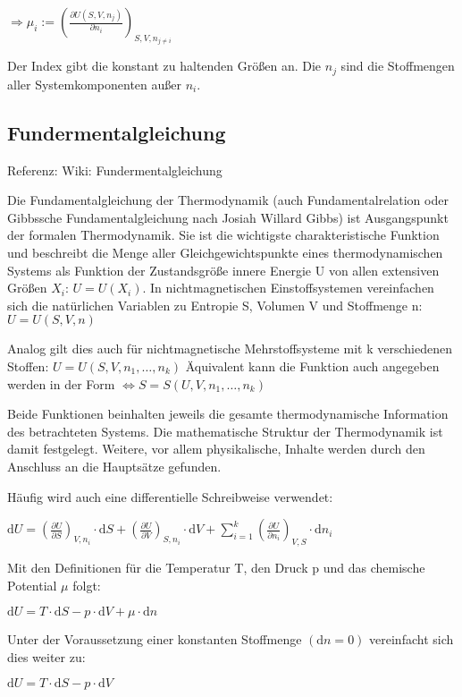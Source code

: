 \documentclass[]{article}
\begin{document}
   $ \Rightarrow \mu_i := \left( \frac{\partial U(S,V,n_j)}{\partial {n_i}} \right)_{S,V,n_{j\ne i}}$

Der Index gibt die konstant zu haltenden Größen an. Die $n_j$ sind die Stoffmengen aller Systemkomponenten außer $n_i$.


\subsection{Fundermentalgleichung}
Referenz: Wiki: Fundermentalgleichung

Die Fundamentalgleichung der Thermodynamik (auch Fundamentalrelation oder Gibbssche Fundamentalgleichung nach Josiah Willard Gibbs) ist Ausgangspunkt der formalen Thermodynamik. Sie ist die wichtigste charakteristische Funktion und beschreibt die Menge aller Gleichgewichtspunkte eines thermodynamischen Systems als Funktion der Zustandsgröße innere Energie U von allen extensiven Größen $X_i$: $ U = U(X_i)$. In nichtmagnetischen Einstoffsystemen vereinfachen sich die natürlichen Variablen zu Entropie S, Volumen V und Stoffmenge n:$U = U(S,V,n)$

Analog gilt dies auch für nichtmagnetische Mehrstoffsysteme mit k verschiedenen Stoffen: $U = U(S, V, n_1, \dots, n_k)$ Äquivalent kann die Funktion auch angegeben werden in der Form $\Leftrightarrow S = S(U, V, n_1, \dots, n_k)$

Beide Funktionen beinhalten jeweils die gesamte thermodynamische Information des betrachteten Systems. Die mathematische Struktur der Thermodynamik ist damit festgelegt. Weitere, vor allem physikalische, Inhalte werden durch den Anschluss an die Hauptsätze gefunden.

Häufig wird auch eine differentielle Schreibweise verwendet:

 $ \mathrm{d} U = \left( \frac {\partial U}{\partial S} \right)_{V, n_i} \cdot \mathrm{d}S + \left( \frac {\partial U}{\partial V} \right)_{S, n_i} \cdot \mathrm{d}V + \sum_{i = 1}^k \left( \frac {\partial U}{\partial n_i} \right)_{V, S} \cdot \mathrm{d}n_i$

Mit den Definitionen für die Temperatur T, den Druck p und das chemische Potential $\mu$ folgt:

 $\mathrm{d}U = T \cdot \mathrm{d}S - p \cdot \mathrm{d}V + \mu \cdot \mathrm{d}n$

Unter der Voraussetzung einer konstanten Stoffmenge $(\mathrm{d}n = 0)$ vereinfacht sich dies weiter zu:

 $ \mathrm{d}U = T \cdot \mathrm{d}S - p \cdot \mathrm{d}V$
\end{document}
